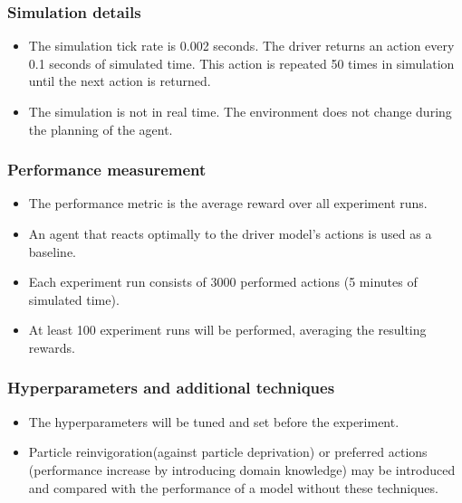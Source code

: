 \subsubsection*{Simulation details}
\begin{itemize}
    \item The simulation tick rate is 0.002 seconds. The driver returns an action every 0.1 seconds of simulated time. This action is repeated 50 times in simulation until the next action is returned.
    \item The simulation is not in real time. The environment does not change during the planning of the agent.
\end{itemize}

\subsubsection*{Performance measurement}
\begin{itemize}
    \item The performance metric is the average reward over all experiment runs.
    \item An agent that reacts optimally to the driver model's actions is used as a baseline.
    \item Each experiment run consists of 3000 performed actions (5 minutes of simulated time).
    \item At least 100 experiment runs will be performed, averaging the resulting rewards.
\end{itemize}

\subsubsection*{Hyperparameters and additional techniques}
\begin{itemize}
    \item The hyperparameters will be tuned and set before the experiment.
    \item Particle reinvigoration(against particle deprivation) or preferred actions (performance increase by introducing domain knowledge) may be introduced and compared with the performance of a model without these techniques.
\end{itemize}